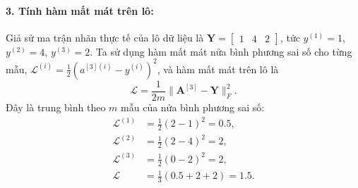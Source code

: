 \paragraph{3. Tính hàm mất mát trên lô:}
Giả sử ma trận nhãn thực tế của lô dữ liệu là $\mathbf{Y} = \begin{bmatrix} 1 & 4 & 2 \end{bmatrix}$, tức $y^{(1)} = 1$, $y^{(2)} = 4$, $y^{(3)} = 2$. Ta sử dụng hàm mất mát nửa bình phương sai số cho từng mẫu, $\mathcal{L}^{(i)} = \frac{1}{2}\left(a^{[3](i)} - y^{(i)}\right)^2$, và hàm mất mát trên lô là
\begin{equation}
\mathcal{L}=\frac{1}{2m}\|\mathbf{A}^{[3]}-\mathbf{Y}\|_F^2.
\label{eq:bpb_example_loss}
\end{equation}
Đây là trung bình theo $m$ mẫu của nửa bình phương sai số:
\begin{align*}
\mathcal{L}^{(1)} &= \tfrac{1}{2}(2 - 1)^2 = 0.5, \\
\mathcal{L}^{(2)} &= \tfrac{1}{2}(2 - 4)^2 = 2, \\
\mathcal{L}^{(3)} &= \tfrac{1}{2}(0 - 2)^2 = 2, \\
\mathcal{L} &= \frac{1}{3}\left(0.5 + 2 + 2\right) = 1.5.
\end{align*}

